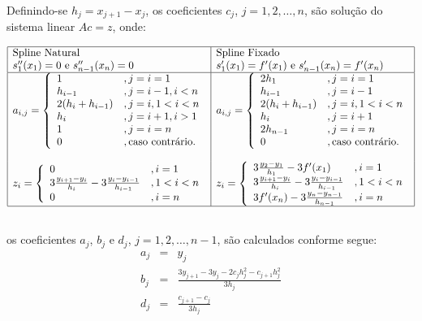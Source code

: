 Definindo-se $h_j = x_{j+1} - x_j$, os coeficientes $c_j$, $j=1,2,\dotsc,n$, são solução do sistema linear $Ac = z$, onde:
\begin{small}
  \begin{equation*}
  \begin{array}{|l|l|}\hline
    \text{Spline Natural} & \text{Spline Fixado}\\
    s_1''(x_1) = 0 \text{ e } s_{n-1}''(x_n) = 0 & s_1'(x_1) = f'(x_1) \text{ e } s_{n-1}'(x_n) = f'(x_n)\\ \hline
    a_{i,j} = \left\{
      \begin{array}{ll}
        1 &, j=i=1\\
        h_{i-1} &, j = i-1, i<n\\
        2(h_i + h_{i-1}) &, j=i, 1<i<n\\
        h_i &, j=i+1, i>1\\
        1 &, j=i=n\\
        0 &, \text{caso contrário.}
      \end{array}
\right. &  a_{i,j} = \left\{
      \begin{array}{ll}
        2h_1 &, j=i=1\\
        h_{i-1} &, j = i-1\\
        2(h_i + h_{i-1}) &, j=i, 1<i<n\\
        h_i &, j=i+1\\
        2h_{n-1} &, j=i=n\\
        0 &, \text{caso contrário.}
      \end{array}
\right.\\
&\\
z_i = \left\{
  \begin{array}{ll}
    0 &, i=1\\
    3\frac{y_{i+1}-y_i}{h_i} - 3\frac{y_i-y_{i-1}}{h_{i-1}} &, 1<i<n\\
    0 &, i=n
  \end{array}
\right. & z_i = \left\{
  \begin{array}{ll}
    3\frac{y_2-y_1}{h_1} - 3f'(x_1) &, i=1\\
    3\frac{y_{i+1}-y_i}{h_i} - 3\frac{y_i-y_{i-1}}{h_{i-1}} &, 1<i<n\\
    3f'(x_n) - 3\frac{y_n - y_{n-1}}{h_{n-1}} &, i=n
  \end{array}
\right. \\ \hline
\multicolumn{2}{c}{}
  \end{array}
\end{equation*}
\end{small}
os coeficientes $a_j$, $b_j$ e $d_j$, $j=1,2,\dotsc,n-1$, são calculados conforme segue:
\begin{eqnarray*}
  a_j &=& y_j\\
  b_j &=& \frac{3y_{j+1} - 3y_j - 2c_jh_j^2 - c_{j+1}h_j^2}{3h_j}\\
  d_j &=& \frac{c_{j+1} - c_j}{3h_j}
\end{eqnarray*}

% 